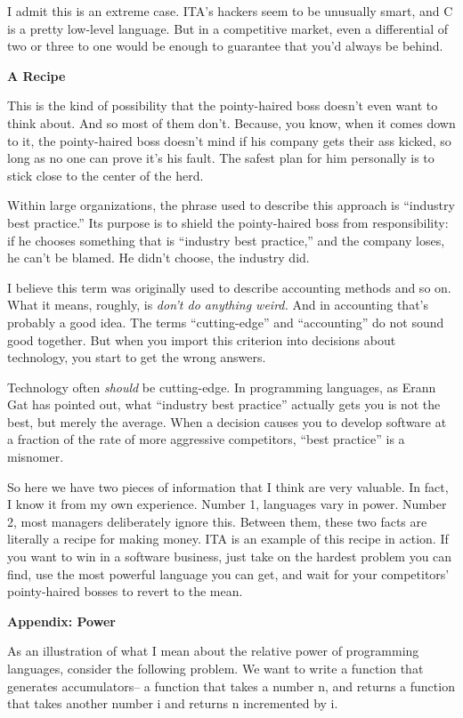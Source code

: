 I admit this is an extreme case. ITA's hackers seem to be unusually
smart, and C is a pretty low-level language. But in a competitive
market, even a differential of two or three to one would be enough to
guarantee that you'd always be behind.

\textbf{A Recipe}

This is the kind of possibility that the pointy-haired boss doesn't even
want to think about. And so most of them don't. Because, you know, when
it comes down to it, the pointy-haired boss doesn't mind if his company
gets their ass kicked, so long as no one can prove it's his fault. The
safest plan for him personally is to stick close to the center of the
herd.

Within large organizations, the phrase used to describe this approach is
``industry best practice.'' Its purpose is to shield the pointy-haired
boss from responsibility: if he chooses something that is ``industry
best practice,'' and the company loses, he can't be blamed. He didn't
choose, the industry did.

I believe this term was originally used to describe accounting methods
and so on. What it means, roughly, is \emph{don't do anything weird.}
And in accounting that's probably a good idea. The terms
``cutting-edge'' and ``accounting'' do not sound good together. But when
you import this criterion into decisions about technology, you start to
get the wrong answers.

Technology often \emph{should} be cutting-edge. In programming
languages, as Erann Gat has pointed out, what ``industry best practice''
actually gets you is not the best, but merely the average. When a
decision causes you to develop software at a fraction of the rate of
more aggressive competitors, ``best practice'' is a misnomer.

So here we have two pieces of information that I think are very
valuable. In fact, I know it from my own experience. Number 1, languages
vary in power. Number 2, most managers deliberately ignore this. Between
them, these two facts are literally a recipe for making money. ITA is an
example of this recipe in action. If you want to win in a software
business, just take on the hardest problem you can find, use the most
powerful language you can get, and wait for your competitors'
pointy-haired bosses to revert to the mean.

\textbf{Appendix: Power}

As an illustration of what I mean about the relative power of
programming languages, consider the following problem. We want to write
a function that generates accumulators-- a function that takes a number
n, and returns a function that takes another number i and returns n
incremented by i.

